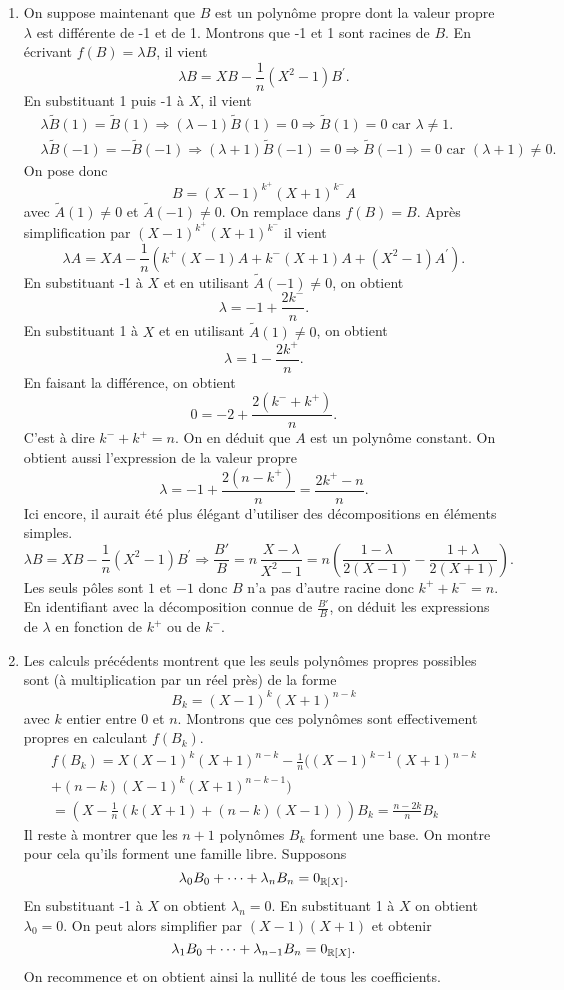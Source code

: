 \begin{enumerate}
\item On suppose maintenant que $B$ est un polynôme propre dont la valeur propre $\lambda$ est différente de -1 et de 1. Montrons que -1 et 1 sont racines de $B$. En écrivant $f(B)=\lambda B$, il vient
\[
\lambda B = XB - \frac{1}{n}(X^2-1)B^\prime.
\]
En substituant 1  puis -1 à $X$, il vient
\[
  \begin{aligned}
    &\lambda \tilde{B}(1) = \tilde{B}(1) \Rightarrow (\lambda -1)\tilde{B}(1) = 0 \Rightarrow \tilde{B}(1) = 0 \text{ car } \lambda \neq 1.\\
    &\lambda \tilde{B}(-1) = -\tilde{B}(-1) \Rightarrow (\lambda +1)\tilde{B}(-1) = 0 \Rightarrow \tilde{B}(-1) = 0 \text{ car } (\lambda +1)\neq 0.
  \end{aligned}
\]
On pose donc
\[
B = (X-1)^{k^+}(X+1)^{k^-}A
\]
avec $\tilde{A}(1)\neq 0$ et $\tilde{A}(-1)\neq 0$. On remplace dans $f(B)=B$. Après simplification par $(X-1)^{k^+}(X+1)^{k^-}$ il vient
\[
\lambda A = XA-\frac{1}{n}(k^+(X-1)A+k^-(X+1)A+(X^2-1)A^\prime).
\] 
En substituant -1 à $X$ et en utilisant $\tilde{A}(-1)\neq 0$, on obtient
\[
\lambda=-1+\frac{2k^-}{n}.
\]
En substituant 1 à $X$ et en utilisant $\tilde{A}(1)\neq 0$, on obtient
\[
\lambda=1-\frac{2k^+}{n}.
\]
En faisant la différence, on obtient
\[
0=-2+\frac{2(k^-+k^+)}{n}.
\]
C'est à dire $k^-+k^+=n$. On en déduit que $A$ est un polynôme constant. On obtient aussi l'expression de la valeur propre
\[
\lambda=-1+\frac{2(n - k^+)}{n} = \frac{2k^+-n}{n}.
\]
Ici encore, il aurait été plus élégant d'utiliser des décompositions en éléments simples.
\[
  \lambda B = XB - \frac{1}{n}(X^2-1)B^\prime
  \Rightarrow \frac{B'}{B} = n\, \frac{X - \lambda}{X^2 - 1}
  = n\left( \frac{1-\lambda}{2(X-1)} - \frac{1+\lambda}{2(X+1)}\right).
\]
Les seuls pôles sont $1$ et $-1$ donc $B$ n'a pas d'autre racine donc $k^+ + k^- = n$. En identifiant avec la décomposition connue de $\frac{B'}{B}$, on déduit les expressions de $\lambda$ en fonction de $k^+$ ou de $k^-$. 


\item Les calculs précédents montrent que les seuls polynômes propres possibles sont (à multiplication par un réel près) de la forme
\[B_k=(X-1)^k(X+1)^{n-k}\]
avec $k$ entier entre 0 et $n$. Montrons que ces polynômes sont effectivement propres en calculant $f(B_k)$.
\begin{multline*}
f(B_k) =  X(X-1)^k(X+1)^{n-k}-\frac{1}{n}((X-1)^{k-1}(X+1)^{n-k}\\
  +(n-k)(X-1)^k(X+1)^{n-k-1} ) \\
= \left( X-\frac{1}{n}(k(X+1)+(n-k)(X-1))\right)B_k = \frac{n-2k}{n}B_k
\end{multline*}
Il reste à montrer que les $n+1$ polynômes $B_k$ forment une base. On montre pour cela qu'ils forment une famille libre. Supposons
\[
\lambda_0 B_0 +\cdots +\lambda_n B_n= 0_{\mathbb{R}[X]}.
\]
En substituant -1 à $X$ on obtient $\lambda_n=0$. En substituant 1 à $X$ on obtient $\lambda_0=0$. On peut alors simplifier par $(X-1)(X+1)$ et obtenir
\[
\lambda_1 B_0 +\cdots +\lambda_{n-1} B_n= 0_{\mathbb{R}[X]}.
\]
On recommence et on obtient ainsi la nullité de tous les coefficients.
\end{enumerate}
